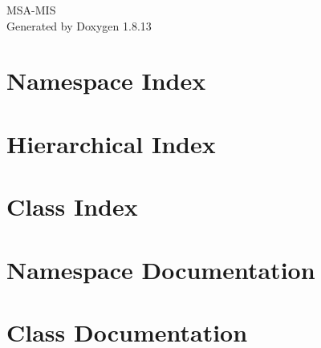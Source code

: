 \documentclass[twoside]{book}
\newcommand{\+}{\discretionary{\mbox{\scriptsize$\hookleftarrow$}}{}{}}
\newcommand{\clearemptydoublepage}{%
  \newpage{\pagestyle{empty}\cleardoublepage}%
}
\begin{document}
\hypersetup{pageanchor=false,
             bookmarksnumbered=true,
             pdfencoding=unicode
            }
\begin{titlepage}
\vspace*{7cm}
\begin{center}%
{\Large M\+S\+A-\/\+M\+IS }\\
\vspace*{1cm}
{\large Generated by Doxygen 1.8.13}\\
\end{center}
\end{titlepage}
\clearemptydoublepage
{}
\tableofcontents
\clearemptydoublepage
{}
\hypersetup{pageanchor=true}

\chapter{Namespace Index}

\chapter{Hierarchical Index}

\chapter{Class Index}

\chapter{Namespace Documentation}



\chapter{Class Documentation}




















\backmatter
\newpage
{}
\clearemptydoublepage
{}
\printindex
\end{document}
